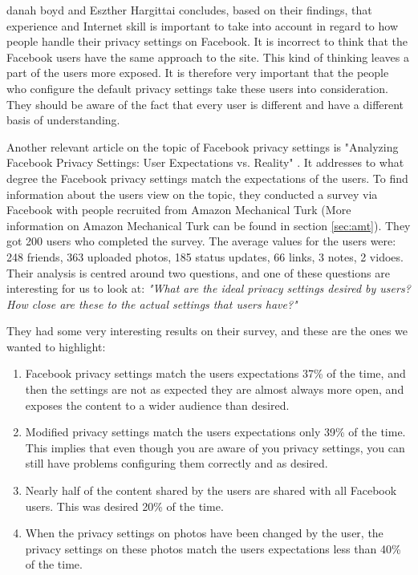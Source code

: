 danah boyd and Eszther Hargittai concludes, based on their findings, that experience and Internet skill is important to take into account in regard to how people handle their privacy settings on Facebook. It is incorrect to think that the Facebook users have the same approach to the site. This kind of thinking leaves a part of the users more exposed. It is therefore very important that the people who configure the default privacy settings take these users into consideration. They should be aware of the fact that every user is different and have a different basis of understanding. 

Another relevant article on the topic of Facebook privacy settings is "Analyzing Facebook Privacy Settings: User Expectations vs. Reality" \cite{expectations}. It addresses to what degree the Facebook privacy settings match the expectations of the users. To find information about the users view on the topic, they conducted a survey via Facebook with people recruited from Amazon Mechanical Turk (More information on Amazon Mechanical Turk can be found in section \ref{sec:amt}). They got 200 users who completed the survey. The average values for the users were: 248 friends, 363 uploaded photos, 185 status updates, 66 links, 3 notes, 2 vidoes. Their analysis is centred around two questions, and one of these questions are interesting for us to look at: \emph{"What are the ideal privacy settings desired by users? How close are these to the actual settings that users have?"}

They had some very interesting results on their survey, and these are the ones we wanted to highlight:
\begin{enumerate}
\item Facebook privacy settings match the users expectations 37\% of the time, and then the settings are not as expected they are almost always more open, and exposes the content to a wider audience than desired.  
\item Modified privacy settings match the users expectations only 39\% of the time. This implies that even though you are aware of you privacy settings, you can still have problems configuring them correctly and as desired.
\item Nearly half of the content shared by the users are shared with all Facebook users. This was desired 20\% of the time. 
\item When the privacy settings on photos have been changed by the user, the privacy settings on these photos match the users expectations less than 40\% of the time. 
\end{enumerate}

